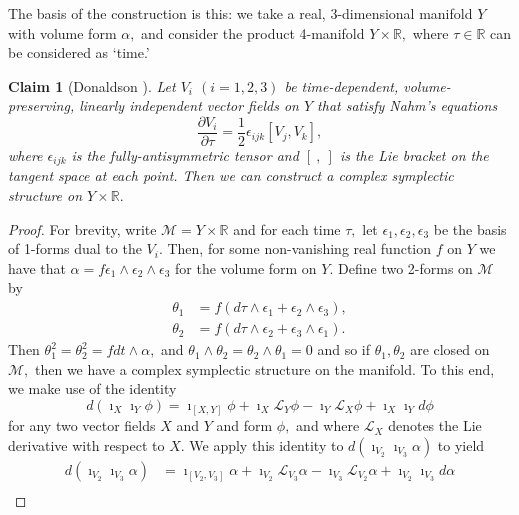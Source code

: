 \documentclass[a4paper,onecolumn,12pt]{article}
\newtheorem{claim}[thm]{Claim}
\theoremstyle{definition}
\theoremstyle{remark}
\newcommand{\al}{\alpha}
\newcommand{\e}{\epsilon}
\newcommand{\ddt}[1]{\frac{\partial #1}{\partial \tau}}
\newcommand{\R}{\mathbb{R}}
\begin{document}
The basis of the construction is this: we take a real, 3-dimensional manifold $Y$ with volume form $\al,$ and consider the product 4-manifold $Y\times\R,$ where $\tau\in\R$ can be considered as `time.'\\

\begin{claim}[Donaldson \cite{donaldson}]
	Let $V_{i}$ $(i=1,2,3)$ be time-dependent, volume-preserving, linearly independent vector fields on $Y$ that satisfy Nahm's equations
	$$\ddt{V_{i}} = \frac{1}{2}\e_{ijk}[V_{j},V_{k}],
	$$
	where $\e_{ijk}$ is the fully-antisymmetric tensor and $[\ ,\ ]$ is the Lie bracket on the tangent space at each point. Then we can construct a complex symplectic structure on $Y\times\R.$
\end{claim}
\begin{proof}
	For brevity, write $\mathcal{M} = Y\times\R$ and for each time $\tau,$ let $\e_{1},\e_{2},\e_{3}$ be the basis of 1-forms dual to the $V_{i}.$ Then, for some non-vanishing real function $f$ on $Y$ we have that $\alpha=f\e_{1}\wedge\e_{2}\wedge\e_{3}$
	for the volume form on $Y.$ Define two 2-forms on $\mathcal{M}$ by
	\begin{subequations}
		\begin{align}
		\theta_{1} &= f(d\tau \wedge \e_{1} +  \e_{2}\wedge \e_{3}),\\
		\theta_{2} &= f(d\tau \wedge \e_{2} +  \e_{3}\wedge \e_{1}).
		\end{align}
	\end{subequations}
	Then $\theta^{2}_{1}=\theta^{2}_{2}=f dt\wedge\alpha,$ and $\theta_{1}\wedge\theta_{2}=\theta_{2}\wedge\theta_{1}=0$ and so if $\theta_{1}, \theta_{2}$ are closed on $\mathcal{M},$ then we have a complex symplectic structure on the manifold. To this end, we make use of the identity
	\begin{equation}
	\label{cartan}
	d(\imath_{X}\imath_{Y}\phi) = \imath_{[X,Y]}\phi + \imath_{X}\mathcal{L}_{Y}\phi - \imath_{Y}\mathcal{L}_{X}\phi + \imath_{X}\imath_{Y}d\phi
	\end{equation}
	for any two vector fields $X$ and $Y$ and form $\phi,$ and where $\mathcal{L}_{X}$ denotes the Lie derivative with respect to $X$. We apply this identity to $d(\imath_{V_{2}}\imath_{V_{3}}\alpha)$ to yield
	\begin{align*}
	d(\imath_{V_{2}}\imath_{V_{3}}\alpha) &= \imath_{[V_{2},V_{3}]}\alpha + \imath_{V_{2}}\mathcal{L}_{V_{3}}\alpha - \imath_{V_{3}}\mathcal{L}_{V_{2}}\alpha + \imath_{V_{2}}\imath_{V_{3}}d\alpha\\

\end{align*}
\end{proof}
\end{document}
